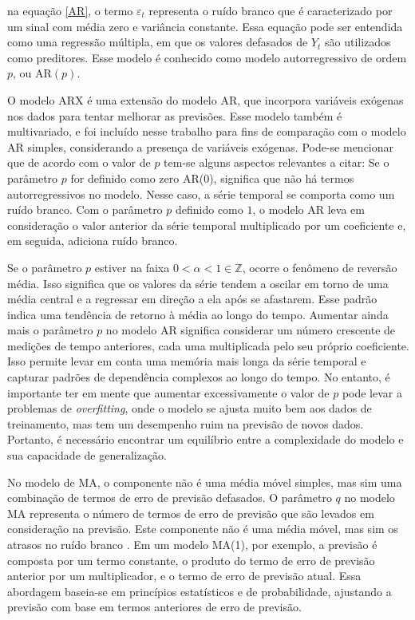 \noindent na equação \eqref{AR}, o termo $\varepsilon_t$ representa o ruído branco que é caracterizado por um sinal com média zero e variância constante. Essa equação pode ser entendida como uma regressão múltipla, em que os valores defasados de $Y_t$ são utilizados como preditores. Esse modelo é conhecido como modelo autorregressivo de ordem $p$, ou AR$(p)$.
 
O modelo ARX é uma extensão do modelo AR, que incorpora variáveis exógenas nos dados para tentar melhorar as previsões. Esse modelo também é multivariado, e foi incluído nesse trabalho para fins de comparação com o modelo AR simples, considerando a presença de variáveis exógenas. Pode-se mencionar que de acordo com o valor de $p$ tem-se alguns aspectos relevantes a citar:
 Se o parâmetro $p$ for definido como zero AR($0$), significa que não há termos autorregressivos no modelo. Nesse caso, a série temporal se comporta como um ruído branco. Com o parâmetro $p$ definido como $1$, o modelo AR leva em consideração o valor anterior da série temporal multiplicado por um coeficiente e, em seguida, adiciona ruído branco. 
 
 Se o parâmetro $p$ estiver na faixa $0 < \alpha < 1 \in \mathbb{Z}$, ocorre o fenômeno de reversão média. Isso significa que os valores da série tendem a oscilar em torno de uma média central e a regressar em direção a ela após se afastarem. Esse padrão indica uma tendência de retorno à média ao longo do tempo. Aumentar ainda mais o parâmetro $p$ no modelo AR significa considerar um número crescente de medições de tempo anteriores, cada uma multiplicada pelo seu próprio coeficiente. Isso permite levar em conta uma memória mais longa da série temporal e capturar padrões de dependência complexos ao longo do tempo. No entanto, é importante ter em mente que aumentar excessivamente o valor de $p$ pode levar a problemas de \textit{overfitting}, onde o modelo se ajusta muito bem aos dados de treinamento, mas tem um desempenho ruim na previsão de novos dados. Portanto, é necessário encontrar um equilíbrio entre a complexidade do modelo e sua capacidade de generalização.
 
No modelo de MA, o componente não é uma média móvel simples, mas sim uma combinação de termos de erro de previsão defasados. O parâmetro $q$ no modelo MA representa o número de termos de erro de previsão que são levados em consideração na previsão. Este componente não é uma média móvel, mas sim os atrasos no ruído branco \cite{signal}.
Em um modelo MA(1), por exemplo, a previsão é composta por um termo constante, o produto do termo de erro de previsão anterior por um multiplicador, e o termo de erro de previsão atual. Essa abordagem baseia-se em princípios estatísticos e de probabilidade, ajustando a previsão com base em termos anteriores de erro de previsão.
 
